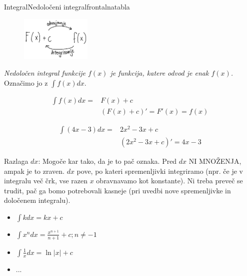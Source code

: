 \begin{priprava}{}{}{Integral}{Nedoločeni integral}{frontalna}{tabla}

\newpage


\begin{figure}[h]
    \centering
    \includegraphics[width=0.3\textwidth]{slike/povezava_F(x)_f(x).png}
\end{figure}


\emph{Nedoločen integral funkcije $ f(x) $ je funkcija, katere odvod je enak $ f(x) $.} Označimo jo z $ \int f(x) dx $.

\begin{align*}
    \int f(x) dx = & F(x) + c \\
    & (F(x) + c)' = F'(x) = f(x)
\end{align*}


\begin{align*}
    \int (4x - 3) dx = & 2x^2 - 3x + c \\
    & (2x^2 - 3x + c)' = 4x - 3
\end{align*}

\textcolor{rdeca}{Razlaga $ dx $:} Mogoče kar tako, da je to pač oznaka. Pred $ dx $ NI MNOŽENJA, ampak je to zraven. $ dx $ pove, po kateri spremenljivki integriramo (npr. če je v integralu več črk, vse razen $ x $ obravnavamo kot konstante). Ni treba preveč se trudit, pač ga bomo potrebovali kasneje (pri uvedbi nove spremenljivke in določenem integralu).



\begin{itemize}
    \item $ \int k dx = kx + c $
    \item $ \int x^n dx = \frac{x^{n+1}}{n + 1} + c; n \ne -1 $
    \item $ \int \frac{1}{x} dx = \ln |x| + c $
    \item ...
\end{itemize}


\end{priprava}
